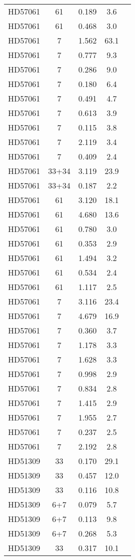 \begin{table*}
\begin{tabular}{l c c c c}
HD57061 & 61 & 0.189 & 3.6\\ 
HD57061 & 61 & 0.468 & 3.0\\ 
HD57061 & 7 & 1.562 & 63.1\\ 
HD57061 & 7 & 0.777 & 9.3\\ 
HD57061 & 7 & 0.286 & 9.0\\ 
HD57061 & 7 & 0.180 & 6.4\\ 
HD57061 & 7 & 0.491 & 4.7\\ 
HD57061 & 7 & 0.613 & 3.9\\ 
HD57061 & 7 & 0.115 & 3.8\\ 
HD57061 & 7 & 2.119 & 3.4\\ 
HD57061 & 7 & 0.409 & 2.4\\ 
HD57061 & 33+34 & 3.119 & 23.9\\ 
HD57061 & 33+34 & 0.187 & 2.2\\ 
HD57061 & 61 & 3.120 & 18.1\\ 
HD57061 & 61 & 4.680 & 13.6\\ 
HD57061 & 61 & 0.780 & 3.0\\ 
HD57061 & 61 & 0.353 & 2.9\\ 
HD57061 & 61 & 1.494 & 3.2\\ 
HD57061 & 61 & 0.534 & 2.4\\ 
HD57061 & 61 & 1.117 & 2.5\\ 
HD57061 & 7 & 3.116 & 23.4\\ 
HD57061 & 7 & 4.679 & 16.9\\ 
HD57061 & 7 & 0.360 & 3.7\\ 
HD57061 & 7 & 1.178 & 3.3\\ 
HD57061 & 7 & 1.628 & 3.3\\ 
HD57061 & 7 & 0.998 & 2.9\\ 
HD57061 & 7 & 0.834 & 2.8\\ 
HD57061 & 7 & 1.415 & 2.9\\ 
HD57061 & 7 & 1.955 & 2.7\\ 
HD57061 & 7 & 0.237 & 2.5\\ 
HD57061 & 7 & 2.192 & 2.8\\ 
\hline
HD51309 & 33 & 0.170 & 29.1\\ 
HD51309 & 33 & 0.457 & 12.0\\ 
HD51309 & 33 & 0.116 & 10.8\\ 
HD51309 & 6+7 & 0.079 & 5.7\\ 
HD51309 & 6+7 & 0.113 & 9.8\\ 
HD51309 & 6+7 & 0.268 & 5.3\\ 
HD51309 & 33 & 0.317 & 10.1\\ 

\end{tabular}
\end{table*}
